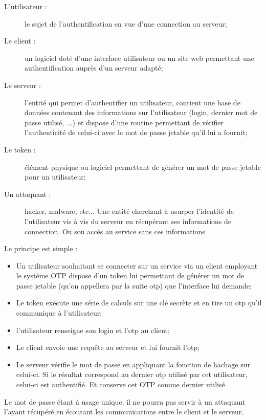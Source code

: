 \documentclass{../res/univ-projet}
\begin{document}
  \begin{description}
    \item[L'utilisateur :] le sujet de l'authentification en vue d'une 
    connection au serveur;
    \item[Le client :] un logiciel doté d'une interface utilisateur ou un site 
    web permettant une authentification auprès d'un serveur adapté;
    \item[Le serveur :] l'entité qui permet d'authentifier un utilisateur,
    contient une base de données contenant des informations sur l'utilisateur 
    (login, dernier mot de 
    passe utilisé, ...) et dispose d'une routine permettant de vérifier 
    l'authenticité de celui-ci avec le mot de passe jetable qu'il lui a fournit;
    \item[Le token :] élément physique ou logiciel permettant de générer un mot 
    de passe jetable pour un utilisateur;
    \item[Un attaquant :] hacker, malware, etc... Une entité cherchant à 
    usurper 
    l'identité de l'utilisateur vis à vis du serveur en récupérant ses informations 
    de connection. Ou son accès au service sans ces informations\\
  \end{description}

  Le principe est simple :

  \begin{itemize}
    \item Un utilisateur souhaitant se connecter sur un service via un client
    employant le système OTP dispose d'un token lui permettant de générer un 
    mot de passe jetable 
    (qu'on appellera par la suite otp) que l'interface lui demande;
    \item Le token exécute une série de calculs sur une clé secrète et en tire 
    un otp qu'il communique à l'utilisateur;
    \item l'utilisateur renseigne son login et l'otp au client;
    \item Le client envoie une requ\^ete au serveur et lui fournit l'otp; 
    \item Le serveur vérifie le mot de passe en appliquant la fonction de 
    hachage sur celui-ci. Si le résultat correspond au dernier otp utilisé par cet 
    utilisateur, celui-ci est authentifié. Et conserve cet OTP comme dernier
    utilisé\\
  \end{itemize}

  Le mot de passe étant à usage unique, il ne pourra pas servir à un attaquant 
l'ayant récupéré en écoutant les communications entre le client et le serveur.
\end{document}
